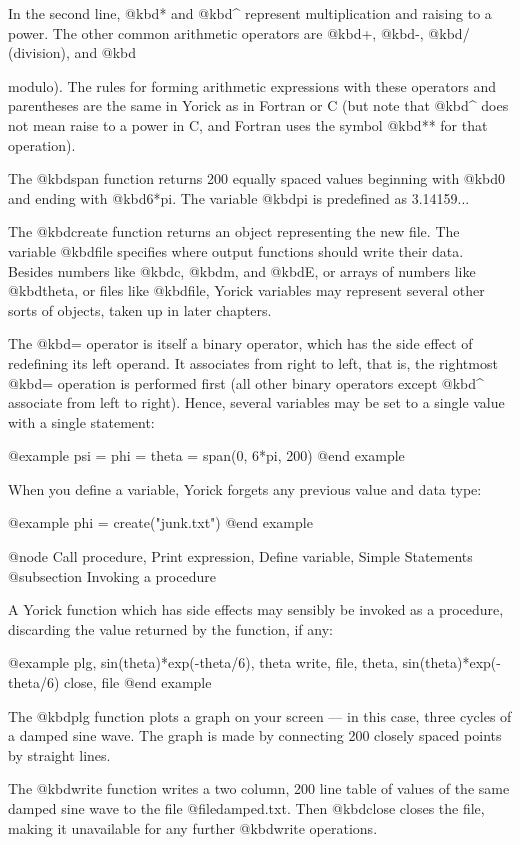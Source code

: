In the second line, @kbd{*} and @kbd{^} represent multiplication and
raising to a power.  The other common arithmetic operators are
@kbd{+}, @kbd{-}, @kbd{/} (division), and @kbd{%
modulo).  The rules for forming arithmetic expressions with these
operators and parentheses are the same in Yorick as in Fortran or C
(but note that @kbd{^} does not mean raise to a power in C, and
Fortran uses the symbol @kbd{**} for that operation).

The @kbd{span} function returns 200 equally spaced values beginning
with @kbd{0} and ending with @kbd{6*pi}.  The variable @kbd{pi} is
predefined as 3.14159...

The @kbd{create} function returns an object representing the new file.
The variable @kbd{file} specifies where output functions should write
their data.  Besides numbers like @kbd{c}, @kbd{m}, and @kbd{E}, or
arrays of numbers like @kbd{theta}, or files like @kbd{file}, Yorick
variables may represent several other sorts of objects, taken up in
later chapters.

The @kbd{=} operator is itself a binary operator, which has the side
effect of redefining its left operand.  It associates from right to
left, that is, the rightmost @kbd{=} operation is performed first (all
other binary operators except @kbd{^} associate from left to right).
Hence, several variables may be set to a single value with a single
statement:

@example
psi = phi = theta = span(0, 6*pi, 200)
@end example

When you define a variable, Yorick forgets any previous value and data
type:

@example
phi = create("junk.txt")
@end example


@node Call procedure, Print expression, Define variable, Simple Statements
@subsection Invoking a procedure

A Yorick function which has side effects may sensibly be invoked as a
procedure, discarding the value returned by the function, if any:

@example
plg, sin(theta)*exp(-theta/6), theta
write, file, theta, sin(theta)*exp(-theta/6)
close, file
@end example

The @kbd{plg} function plots a graph on your screen --- in this case,
three cycles of a damped sine wave.  The graph is made by connecting
200 closely spaced points by straight lines.

The @kbd{write} function writes a two column, 200 line table of values
of the same damped sine wave to the file @file{damped.txt}.  Then
@kbd{close} closes the file, making it unavailable for any further
@kbd{write} operations.

}
